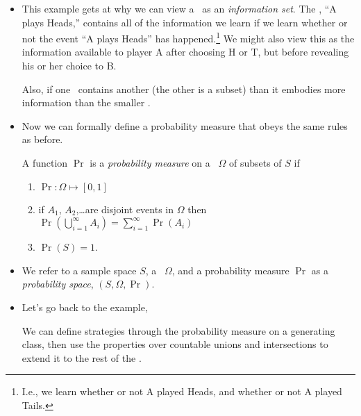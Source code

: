 \begin{itemize}[leftmargin=0pt]
\item This example gets at why we can view a \sigmaalgebra\ as an
  \emph{information set}.  The \sigmaalgebra, ``A plays Heads,'' contains
  all of the information we learn if we learn whether or not the event
  ``A plays Heads'' has happened.\footnote{I.e., we learn whether or
  not A played Heads, and whether or not A played Tails.}  We might
  also view this as the information available to player A after choosing
  H or T, but before revealing his or her choice to B.

  Also, if one \sigmaalgebra\ contains another (the other is a subset) than
  it embodies more information than the smaller \sigmaalgebra.

\item Now we can formally define a probability measure that obeys the
  same rules as before.
  \begin{defn} A function $\Pr$ is a \emph{probability measure} on a
    \sigmaalgebra\ $\Omega$ of subsets of $S$ if
    \begin{enumerate}
    \item $\Pr: \Omega \mapsto [0,1]$
    \item if $A_1$, $A_2$,\dots are disjoint events in $\Omega$ then
      $\Pr(\bigcup_{i=1}^\infty A_i) = \sum_{i=1}^\infty \Pr(A_i)$
    \item $\Pr(S) = 1$.
    \end{enumerate}
  \end{defn}
  
\item We refer to a sample space $S$, a \sigmaalgebra\ $\Omega$, and a
  probability measure $\Pr$ as a \emph{probability space}, $(S, \Omega,
  \Pr)$.

\item Let's go back to the example,
  \begin{ex}
    We can define strategies through the probability measure on a
    generating class, then use the properties over countable unions
    and intersections to extend it to the rest of the \sigmaalgebra.


\end{ex}
\end{itemize}
